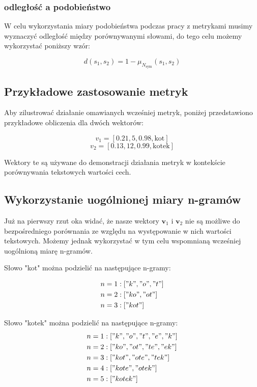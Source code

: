 \documentclass{article}
\begin{document}
\subsubsection*{odległość a podobieństwo}

W celu wykorzystania miary podobieństwa podczas pracy z metrykami musimy wyznaczyć odległość między porównywanymi słowami, do tego celu możemy wykorzystać poniższy wzór:

\begin{equation}
    d(s_1, s_2) = 1 - \mu_{N_{\text{sym}}}(s_1, s_2)
\end{equation}

\subsection*{Przykładowe zastosowanie metryk}

Aby zilustrować działanie omawianych wcześniej metryk, poniżej przedstawiono przykładowe obliczenia dla dwóch wektorów:

\[ v_1 = [0.21, 5, 0.98, \text{kot}] \]
\[ v_2 = [0.13, 12, 0.99, \text{kotek}] \]

\noindent Wektory te są używane do demonstracji działania metryk w kontekście porównywania tekstowych wartości cech.

\subsection*{Wykorzystanie uogólnionej miary n-gramów}

Już na pierwszy rzut oka widać, że nasze wektory \( \mathbf{v}_1 \) i \( \mathbf{v}_2 \) nie są możliwe do bezpośredniego porównania ze względu na występowanie w nich wartości tekstowych. Możemy jednak wykorzystać w tym celu wspomnianą wcześniej uogólnioną miarę n-gramów. \newline

Słowo "kot" można podzielić na następujące n-gramy:

\begin{align*}
    n &= 1:  ["k", "o", "t"] \\
    n &= 2:  ["ko", "ot"] \\
    n &= 3:  ["kot"]
\end{align*}


Słowo "kotek" można podzielić na następujące n-gramy:
\begin{align*}
    n &= 1:  ["k", "o", "t", "e", "k"] \\
    n &= 2:  ["ko", "ot", "te", "ek"] \\
    n &= 3:  ["kot", "ote", "tek"] \\
    n &= 4:  ["kote", "otek"] \\
    n &= 5:  ["kotek"]
\end{align*}
\end{document}
